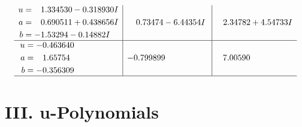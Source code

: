 \documentclass[1p]{elsarticle_modified}
\theoremstyle{definition}
\begin{document}
$$\begin{array}{c|c|c}
\begin{aligned}
u &= \phantom{-}1.334530 - 0.318930 I \\
a &= \phantom{-}0.690511 + 0.438656 I \\
b &= -1.53294 - 0.14882 I\end{aligned}
 & \phantom{-}0.73474 - 6.44354 I & \phantom{-}2.34782 + 4.54733 I \\ \hline\begin{aligned}
u &= -0.463640\phantom{ +0.000000I} \\
a &= \phantom{-}1.65754\phantom{ +0.000000I} \\
b &= -0.356309\phantom{ +0.000000I}\end{aligned}
 & -0.799899\phantom{ +0.000000I} & \phantom{-}7.00590\phantom{ +0.000000I}\\
 \hline 
 \end{array}$$\newpage
\newpage\renewcommand{\arraystretch}{1}
\centering \section*{ III. u-Polynomials}
\end{document}
